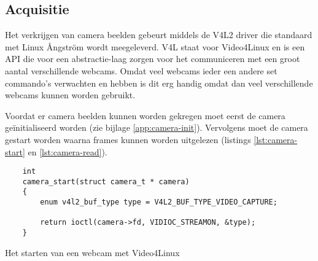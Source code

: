 \subsection{Acquisitie}

Het verkrijgen van camera beelden gebeurt middels de V4L2 driver die standaard
met Linux Ångström wordt meegeleverd. V4L staat voor Video4Linux en is een
API die voor een abstractie-laag zorgen voor het communiceren met een groot
aantal verschillende webcams. Omdat veel webcams ieder een andere set commando's
verwachten en hebben is dit erg handig omdat dan veel verschillende webcams
kunnen worden gebruikt.

Voordat er camera beelden kunnen worden gekregen moet eerst de camera
geïnitialiseerd worden (zie bijlage \ref{app:camera-init}). Vervolgens moet de
camera gestart worden waarna frames kunnen worden uitgelezen (listings
\ref{lst:camera-start} en \ref{lst:camera-read}).

\begin{listing}
    \begin{verbatim}
    int
    camera_start(struct camera_t * camera)
    {
        enum v4l2_buf_type type = V4L2_BUF_TYPE_VIDEO_CAPTURE;

        return ioctl(camera->fd, VIDIOC_STREAMON, &type);
    }
    \end{verbatim}
    \caption{Het starten van een webcam met Video4Linux}
    \label{lst:camera-start}
\end{listing}

